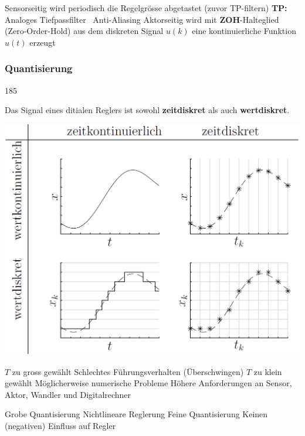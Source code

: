 \begin{outline}
    \1 Sensorseitig wird periodisch die Regelgrösse abgetastet (zuvor TP-filtern)
        \2 \textbf{TP:} Analoges Tiefpassfilter \textrightarrow\ Anti-Aliasing
    \1 Aktorseitig wird mit \textbf{ZOH}-Halteglied (Zero-Order-Hold) aus dem diskreten Signal $u(k)$ eine kontinuierliche Funktion $u(t)$ erzeugt 
\end{outline}


\subsubsection{Quantisierung}{185}

Das Signal eines ditialen Reglers ist sowohl \textbf{zeitdiskret} als auch \textbf{wertdiskret}.

\medskip
\begin{minipage}[c]{0.49\columnwidth}
    \includegraphics[width=\columnwidth]{images/abtastung.png}
\end{minipage}
\hfill
\begin{minipage}[c]{0.5\columnwidth}
    \raggedright%
    \textbf{}

    \begin{outline}
        \1 $T$ zu gross gewählt
            \2 Schlechtes Führungsverhalten (Überschwingen)
        \1 $T$ zu klein gewählt
            \2 Möglicherweise numerische Probleme
            \2 Höhere Anforderungen an Sensor, Aktor, Wandler und Digitalrechner
    \end{outline}


    \textbf{}

    \begin{outline}
        \1 Grobe Quantisierung
            \2 Nichtlineare Reglerung
        \1 Feine Quantisierung
            \2 Keinen (negativen) Einfluss auf Regler 
    \end{outline}
\end{minipage}


